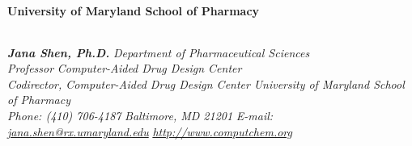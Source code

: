 \setlength\topmargin{-0.50 in}
{\normalfont
\begin{flushright}
{\Large {\bf \color{Maroon} University of Maryland School of Pharmacy}} 
\end{flushright}
\vspace{-0.5cm}
\begin{tabular*}{\linewidth}{c} \hline \end{tabular*}
\begin{flushright}
{\footnotesize {\bf {\em Jana Shen, Ph.D.}} \hspace{\fill} 
        {\em  Department of Pharmaceutical Sciences} }     \\
{\footnotesize {\em Professor} \hspace{\fill} 
        {\em  Computer-Aided Drug Design Center} }                    \\
{\footnotesize {\em Codirector, Computer-Aided Drug Design Center} \hspace{\fill}
        {\em University of Maryland School of Pharmacy} }  \\
{\footnotesize {\em Phone: (410) 706-4187} \hspace{\fill} 
        {\em Baltimore, MD 21201} }          \linebreak
{\footnotesize {\em E-mail: \url{jana.shen@rx.umaryland.edu}} \hspace{\fill} 
        {\em \url{http://www.computchem.org}} }                               \\
        \end{flushright}
\vspace{-0.5cm}
}
